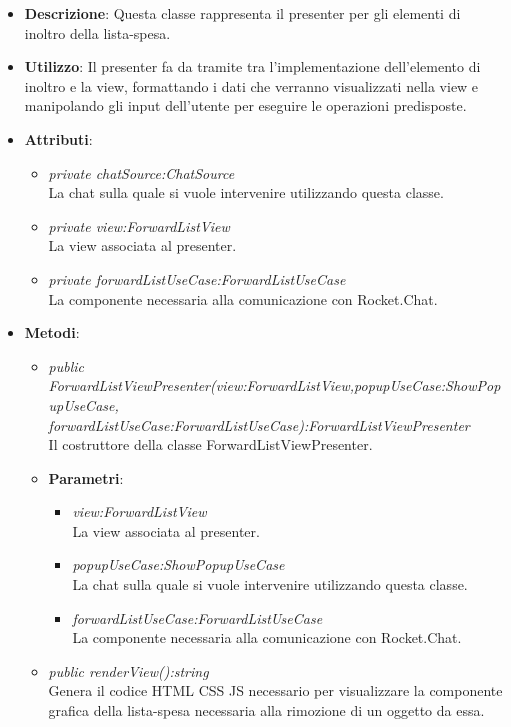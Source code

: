 \begin{itemize}
\item \textbf{Descrizione}: Questa classe rappresenta il presenter per gli elementi di inoltro della lista-spesa.
\item \textbf{Utilizzo}: Il presenter fa da tramite tra l'implementazione dell'elemento di inoltro e la view, formattando i dati che verranno visualizzati nella view e manipolando gli input dell'utente per eseguire le operazioni predisposte.
\item \textbf{Attributi}: 
	\begin{itemize}
	\item \textit{private chatSource:ChatSource}\\
	La chat sulla quale si vuole intervenire utilizzando questa classe.
	\item \textit{private view:ForwardListView}\\
	La view associata al presenter.
	\item \textit {private forwardListUseCase:ForwardListUseCase}\\
	La componente necessaria alla comunicazione con Rocket.Chat.
	\end{itemize}
\item \textbf{Metodi}:
	\begin{itemize}	
	\item \textit{public ForwardListViewPresenter(view:ForwardListView,popupUseCase:ShowPopupUseCase, forwardListUseCase:ForwardListUseCase):ForwardListViewPresenter}\\
	Il costruttore della classe ForwardListViewPresenter.
	\item{\textbf{Parametri}: \begin{itemize}
			\item \textit{view:ForwardListView}\\
			La view associata al presenter.
			\item \textit{popupUseCase:ShowPopupUseCase}\\
			La chat sulla quale si vuole intervenire utilizzando questa classe.			
			\item \textit{forwardListUseCase:ForwardListUseCase}\\
			La componente necessaria alla comunicazione con Rocket.Chat.
			\end{itemize}}
	\item \textit{public renderView():string}\\
		Genera il codice HTML CSS JS necessario per visualizzare la componente grafica della lista-spesa necessaria alla rimozione di un oggetto da essa.

\end{itemize}
\end{itemize}
